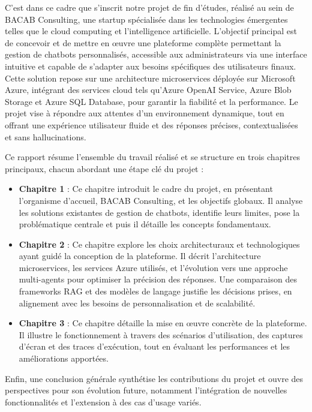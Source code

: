 C’est dans ce cadre que s’inscrit notre projet de fin d’études, réalisé au sein de BACAB Consulting, une startup spécialisée dans les technologies émergentes telles que le cloud computing et l’intelligence artificielle. L’objectif principal est de concevoir et de mettre en œuvre une plateforme complète permettant la gestion de chatbots personnalisés, accessible aux administrateurs via une interface intuitive et capable de s’adapter aux besoins spécifiques des utilisateurs finaux. Cette solution repose sur une architecture microservices déployée sur Microsoft Azure, intégrant des services cloud tels qu’Azure OpenAI Service, Azure Blob Storage et Azure SQL Database, pour garantir la fiabilité et la performance. Le projet vise à répondre aux attentes d’un environnement dynamique, tout en offrant une expérience utilisateur fluide et des réponses précises, contextualisées et sans hallucinations.

Ce rapport résume l’ensemble du travail réalisé et se structure en trois chapitres principaux, chacun abordant une étape clé du projet :
\begin{itemize}
    \item \textbf{Chapitre 1} : Ce chapitre introduit le cadre du projet, en présentant l’organisme d’accueil, BACAB Consulting, et les objectifs globaux. Il analyse les solutions existantes de gestion de chatbots, identifie leurs limites, pose la problématique centrale et puis il détaille les concepts fondamentaux.
    \item \textbf{Chapitre 2} : Ce chapitre explore les choix architecturaux et technologiques ayant guidé la conception de la plateforme. Il décrit l’architecture microservices, les services Azure utilisés, et l’évolution vers une approche multi-agents pour optimiser la précision des réponses. Une comparaison des frameworks RAG et des modèles de langage justifie les décisions prises, en alignement avec les besoins de personnalisation et de scalabilité.
    \item \textbf{Chapitre 3} : Ce chapitre détaille la mise en œuvre concrète de la plateforme. Il illustre le fonctionnement à travers des scénarios d’utilisation, des captures d’écran et des traces d’exécution, tout en évaluant les performances et les améliorations apportées.
\end{itemize}

Enfin, une conclusion générale synthétise les contributions du projet et ouvre des perspectives pour son évolution future, notamment l’intégration de nouvelles fonctionnalités et l’extension à des cas d’usage variés.

